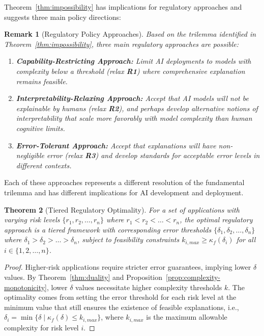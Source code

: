 \documentclass[11pt,letter,leqno]{article}
\newtheorem{theorem}{Theorem}[section]
\newtheorem{remark}[theorem]{Remark}
\begin{document}
Theorem~\ref{thm:impossibility} has implications for regulatory approaches and suggests three main policy directions:

\begin{remark}[Regulatory Policy Approaches]
\label{def:policy-approaches}
Based on the trilemma identified in Theorem~\ref{thm:impossibility}, three main regulatory approaches are possible:
\begin{enumerate}
\item \textbf{Capability-Restricting Approach:} Limit AI deployments to models with complexity below a threshold (relax \textbf{R1}) where comprehensive explanation remains feasible.
\item \textbf{Interpretability-Relaxing Approach:} Accept that AI models will not be explainable by humans (relax \textbf{R2}), and perhaps develop alternative notions of interpretability that scale more favorably with model complexity than human cognitive limits.
\item \textbf{Error-Tolerant Approach:} Accept that explanations will have non-negligible error (relax \textbf{R3}) and develop standards for acceptable error levels in different contexts.
\end{enumerate}
\end{remark}

Each of these approaches represents a different resolution of the fundamental trilemma and has different implications for AI development and deployment.

\begin{theorem}[Tiered Regulatory Optimality]
\label{thm:tiered-optimality}
For a set of applications with varying risk levels $\{r_1, r_2, \ldots, r_n\}$ where $r_1 < r_2 < \ldots < r_n$, the optimal regulatory approach is a tiered framework with corresponding error thresholds $\{\delta_1, \delta_2, \ldots, \delta_n\}$ where $\delta_1 > \delta_2 > \ldots > \delta_n$, subject to feasibility constraints $k_{i,max} \geq \kappa_f(\delta_i)$ for all $i \in \{1, 2, \ldots, n\}$.
\end{theorem}

\begin{proof}
Higher-risk applications require stricter error guarantees, implying lower $\delta$ values. By Theorem~\ref{thm:duality} and Proposition~\ref{prop:complexity-monotonicity}, lower $\delta$ values necessitate higher complexity thresholds $k$. The optimality comes from setting the error threshold for each risk level at the minimum value that still ensures the existence of feasible explanations, i.e., $\delta_i = \min\{\delta \mid \kappa_f(\delta) \leq k_{i,max}\}$, where $k_{i,max}$ is the maximum allowable complexity for risk level $i$.
\end{proof}
\end{document}

